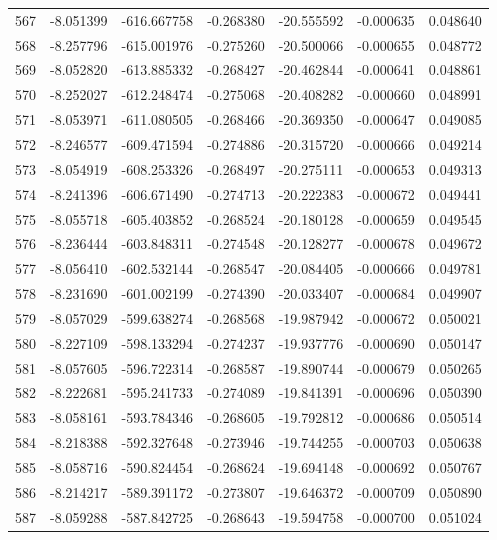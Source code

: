 \begin{tabular}{rrrrrrr}
 567 &  -8.051399 & -616.667758 & -0.268380 & -20.555592 &  -0.000635 &  0.048640 \\
 568 &  -8.257796 & -615.001976 & -0.275260 & -20.500066 &  -0.000655 &  0.048772 \\
 569 &  -8.052820 & -613.885332 & -0.268427 & -20.462844 &  -0.000641 &  0.048861 \\
 570 &  -8.252027 & -612.248474 & -0.275068 & -20.408282 &  -0.000660 &  0.048991 \\
 571 &  -8.053971 & -611.080505 & -0.268466 & -20.369350 &  -0.000647 &  0.049085 \\
 572 &  -8.246577 & -609.471594 & -0.274886 & -20.315720 &  -0.000666 &  0.049214 \\
 573 &  -8.054919 & -608.253326 & -0.268497 & -20.275111 &  -0.000653 &  0.049313 \\
 574 &  -8.241396 & -606.671490 & -0.274713 & -20.222383 &  -0.000672 &  0.049441 \\
 575 &  -8.055718 & -605.403852 & -0.268524 & -20.180128 &  -0.000659 &  0.049545 \\
 576 &  -8.236444 & -603.848311 & -0.274548 & -20.128277 &  -0.000678 &  0.049672 \\
 577 &  -8.056410 & -602.532144 & -0.268547 & -20.084405 &  -0.000666 &  0.049781 \\
 578 &  -8.231690 & -601.002199 & -0.274390 & -20.033407 &  -0.000684 &  0.049907 \\
 579 &  -8.057029 & -599.638274 & -0.268568 & -19.987942 &  -0.000672 &  0.050021 \\
 580 &  -8.227109 & -598.133294 & -0.274237 & -19.937776 &  -0.000690 &  0.050147 \\
 581 &  -8.057605 & -596.722314 & -0.268587 & -19.890744 &  -0.000679 &  0.050265 \\
 582 &  -8.222681 & -595.241733 & -0.274089 & -19.841391 &  -0.000696 &  0.050390 \\
 583 &  -8.058161 & -593.784346 & -0.268605 & -19.792812 &  -0.000686 &  0.050514 \\
 584 &  -8.218388 & -592.327648 & -0.273946 & -19.744255 &  -0.000703 &  0.050638 \\
 585 &  -8.058716 & -590.824454 & -0.268624 & -19.694148 &  -0.000692 &  0.050767 \\
 586 &  -8.214217 & -589.391172 & -0.273807 & -19.646372 &  -0.000709 &  0.050890 \\
 587 &  -8.059288 & -587.842725 & -0.268643 & -19.594758 &  -0.000700 &  0.051024 \\

\end{tabular}
